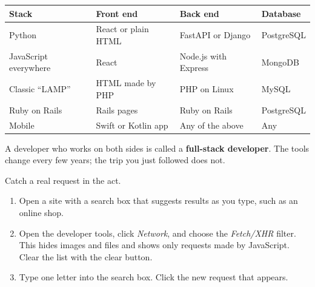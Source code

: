 {\def\LTcaptype{none} %
\begin{longtable}[]{@{}
  >{\raggedright\arraybackslash}p{}
  >{\raggedright\arraybackslash}p{}
  >{\raggedright\arraybackslash}p{}
  >{\raggedright\arraybackslash}p{}@{}}
\toprule\noalign{}
\begin{minipage}[b]{\linewidth}\raggedright
Stack
\end{minipage} & \begin{minipage}[b]{\linewidth}\raggedright
Front end
\end{minipage} & \begin{minipage}[b]{\linewidth}\raggedright
Back end
\end{minipage} & \begin{minipage}[b]{\linewidth}\raggedright
Database
\end{minipage} \\
\midrule\noalign{}
\endhead
\bottomrule\noalign{}
\endlastfoot
Python & React or plain HTML & FastAPI or Django & PostgreSQL \\
JavaScript everywhere & React & Node.js with Express & MongoDB \\
Classic ``LAMP'' & HTML made by PHP & PHP on Linux & MySQL \\
Ruby on Rails & Rails pages & Ruby on Rails & PostgreSQL \\
Mobile & Swift or Kotlin app & Any of the above & Any \\
\end{longtable}
}

A developer who works on both sides is called a \textbf{full-stack developer}. The tools change every few years; the trip you just followed does not.

\label{webapp-04:try-it}

Catch a real request in the act.

\begin{enumerate}
\def\labelenumi{\arabic{enumi}.}
\tightlist
\item
  Open a site with a search box that suggests results as you type, such as an online shop.
\item
  Open the developer tools, click \emph{Network}, and choose the \emph{Fetch/XHR} filter. This hides images and files and shows only requests made by JavaScript. Clear the list with the clear button.
\item
  Type one letter into the search box. Click the new request that appears.
\end{enumerate}

